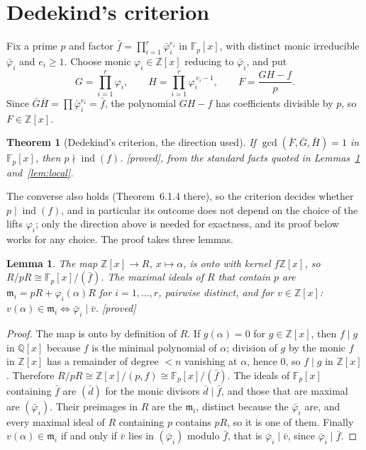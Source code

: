 \documentclass[10pt,a4paper]{article}
\newcommand{\Fp}{\mathbb{F}_p}
\newcommand{\Z}{\mathbb{Z}}
\newcommand{\Q}{\mathbb{Q}}
\newcommand{\m}{\mathfrak{m}}
\DeclareMathOperator{\ind}{ind}
\newcommand{\stproved}{\textsf{\small[proved]}\xspace}
\theoremstyle{plain}
\newtheorem{lemma}[proposition]{Lemma}
\newtheorem{theorem}[proposition]{Theorem}
\theoremstyle{definition}
\begin{document}
\section{Dedekind's criterion}\label{sec:dedekind}

Fix a prime $p$ and factor $\bar f=\prod_{i=1}^r\bar\varphi_i^{e_i}$ in $\Fp[x]$, with distinct monic irreducible $\bar\varphi_i$ and
$e_i\geq1$.  Choose monic $\varphi_i\in\Z[x]$ reducing to $\bar\varphi_i$, and put
\[
G=\prod_{i=1}^r\varphi_i,\qquad H=\prod_{i=1}^r\varphi_i^{\,e_i-1},\qquad F=\frac{GH-f}{p}.
\]
Since $\bar G\bar H=\prod\bar\varphi_i^{e_i}=\bar f$, the polynomial $GH-f$ has coefficients divisible by $p$, so $F\in\Z[x]$.

\begin{theorem}[Dedekind's criterion, the direction used]\label{thm:dedekind}
If $\gcd(\bar F,\bar G,\bar H)=1$ in $\Fp[x]$, then $p\nmid\ind(f)$.  \stproved, from the standard facts quoted in
Lemmas~\ref{lem:ideals} and~\ref{lem:local}.
\end{theorem}

\noindent The converse also holds \cite{Ded,Coh} (Theorem~6.1.4 there), so the criterion decides whether $p\mid\ind(f)$, and
in particular its outcome does not depend on the choice of the lifts $\varphi_i$; only the direction above is needed for exactness,
and its proof below works for any choice.  The proof takes three lemmas.

\begin{lemma}\label{lem:ideals}
The map $\Z[x]\to R$, $x\mapsto\alpha$, is onto with kernel $f\Z[x]$, so $R/pR\cong\Fp[x]/(\bar f)$.  The maximal ideals of $R$ that
contain $p$ are $\m_i=pR+\varphi_i(\alpha)R$ for $i=1,\dots,r$, pairwise distinct, and for $v\in\Z[x]$:
$v(\alpha)\in\m_i\iff\bar\varphi_i\mid\bar v$.  \stproved
\end{lemma}

\begin{proof}
The map is onto by definition of $R$.  If $g(\alpha)=0$ for $g\in\Z[x]$, then $f\mid g$ in $\Q[x]$ because $f$ is the minimal
polynomial of $\alpha$; division of $g$ by the monic $f$ in $\Z[x]$ has a remainder of degree $<n$ vanishing at $\alpha$, hence $0$,
so $f\mid g$ in $\Z[x]$.  Therefore $R/pR\cong\Z[x]/(p,f)\cong\Fp[x]/(\bar f)$.  The ideals of $\Fp[x]$ containing $\bar f$ are
$(\bar d)$ for the monic divisors $\bar d\mid\bar f$, and those that are maximal are $(\bar\varphi_i)$.  Their preimages in $R$ are
the $\m_i$, distinct because the $\bar\varphi_i$ are, and every maximal ideal of $R$ containing $p$ contains $pR$, so it is one of
them.  Finally $v(\alpha)\in\m_i$ if and only if $\bar v$ lies in $(\bar\varphi_i)$ modulo $\bar f$, that is
$\bar\varphi_i\mid\bar v$, since $\bar\varphi_i\mid\bar f$.
\end{proof}
\end{document}
